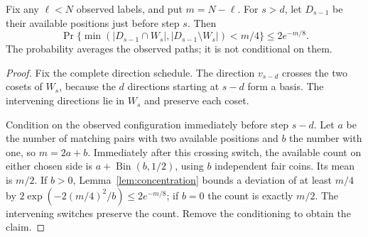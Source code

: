 \begin{lemma}
\label{shear:lem:fixed-balance}
Fix any $\ell<N$ observed labels, and put $m=N-\ell$. For $s>d$,
let $D_{s-1}$ be their available positions just before step $s$.
Then
\begin{equation}\label{shear:eq:fixed-balance}
 \Pr\{\min(|D_{s-1}\cap W_s|,|D_{s-1}\setminus W_s|)<m/4\}
 \le2e^{-m/8}.
\end{equation}
The probability averages the observed paths; it is not
conditional on them.
\end{lemma}
\begin{proof}
Fix the complete direction schedule. The direction $v_{s-d}$
crosses the two cosets of $W_s$, because the $d$ directions
starting at $s-d$ form a basis. The intervening directions lie
in $W_s$ and preserve each coset.

Condition on the observed configuration immediately before step
$s-d$. Let $a$ be the number of matching pairs with two available
positions and $b$ the number with one, so $m=2a+b$. Immediately
after this crossing switch, the available count on either chosen
side is $a+\operatorname{Bin}(b,1/2)$, using $b$ independent fair
coins. Its mean is $m/2$. If $b>0$, Lemma~\ref{lem:concentration}
bounds a deviation of at least $m/4$ by
$2\exp(-2(m/4)^2/b)\le2e^{-m/8}$; if $b=0$ the count is exactly
$m/2$. The intervening switches preserve the count. Remove the
conditioning to obtain the claim.
\end{proof}

